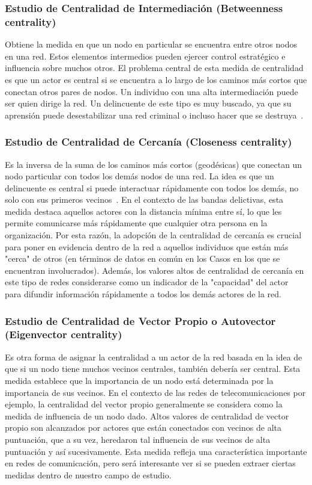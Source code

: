 
\subsubsection{Estudio de Centralidad de Intermediación (Betweenness centrality)} Obtiene la medida en que un nodo en particular se encuentra entre otros nodos en una red. Estos elementos intermedios pueden ejercer control estratégico e influencia sobre muchos otros. El problema central de esta medida de centralidad es que un actor es central si se encuentra a lo largo de los caminos más cortos que conectan otros pares de nodos. Un individuo con una alta intermediación puede ser quien dirige la red. Un delincuente de este tipo es muy buscado, ya que su aprensión puede desestabilizar una red criminal o incluso hacer que se destruya~\cite{ref_article32}.

\subsubsection{Estudio de Centralidad de Cercanía (Closeness centrality)} Es la inversa de la suma de los caminos más cortos (geodésicas) que conectan un nodo particular con todos los demás nodos de una red. La idea es que un delincuente es central si puede interactuar rápidamente con todos los demás, no solo con sus primeros vecinos~\cite{ref_article33}. En el contexto de las bandas delictivas, esta medida destaca aquellos actores con la distancia mínima entre sí, lo que les permite comunicarse más rápidamente que cualquier otra persona en la organización. Por esta razón, la adopción de la centralidad de cercanía es crucial para poner en evidencia dentro de la red a aquellos individuos que están más "cerca" de otros (en términos de datos en común en los Casos en los que se encuentran involucrados). Además, los valores altos de centralidad de cercanía en este tipo de redes considerarse como un indicador de la "capacidad" del actor para difundir información rápidamente a todos los demás actores de la red.

\subsubsection{Estudio de Centralidad de Vector Propio o Autovector (Eigenvector centrality)} Es otra forma de asignar la centralidad a un actor de la red basada en la idea de que si un nodo tiene muchos vecinos centrales, también debería ser central. Esta medida establece que la importancia de un nodo está determinada por la importancia de sus vecinos. En el contexto de las redes de telecomunicaciones por ejemplo, la centralidad del vector propio generalmente se considera como la medida de influencia de un nodo dado. Altos valores de centralidad de vector propio son alcanzados por actores que están conectados con vecinos de alta puntuación, que a su vez, heredaron tal influencia de sus vecinos de alta puntuación y así sucesivamente. Esta medida refleja una característica importante en redes de comunicación, pero será interesante ver si se pueden extraer ciertas medidas dentro de nuestro campo de estudio.

